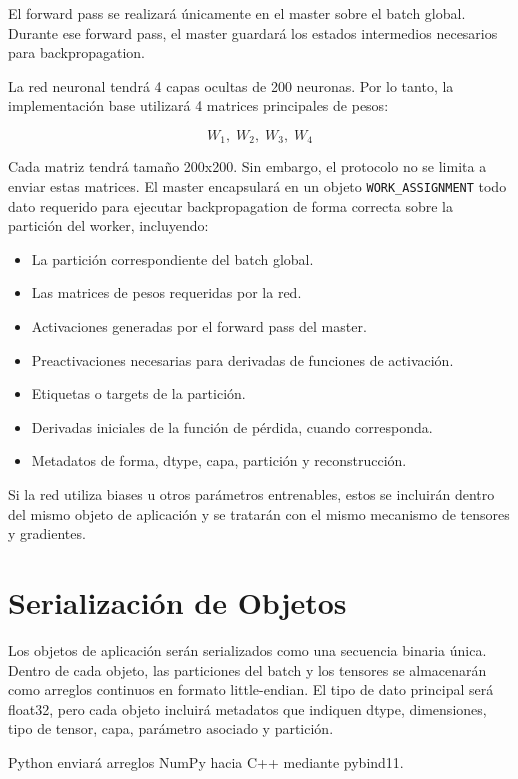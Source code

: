 \documentclass[12pt]{article}
\begin{document}
El forward pass se realizará únicamente en el master sobre el batch global. Durante ese forward pass, el master guardará los estados intermedios necesarios para backpropagation.

La red neuronal tendrá 4 capas ocultas de 200 neuronas. Por lo tanto, la implementación base utilizará 4 matrices principales de pesos:

\[
W_1,\; W_2,\; W_3,\; W_4
\]

Cada matriz tendrá tamaño 200x200. Sin embargo, el protocolo no se limita a enviar estas matrices. El master encapsulará en un objeto \texttt{WORK\_ASSIGNMENT} todo dato requerido para ejecutar backpropagation de forma correcta sobre la partición del worker, incluyendo:

\begin{itemize}
\item La partición correspondiente del batch global.
\item Las matrices de pesos requeridas por la red.
\item Activaciones generadas por el forward pass del master.
\item Preactivaciones necesarias para derivadas de funciones de activación.
\item Etiquetas o targets de la partición.
\item Derivadas iniciales de la función de pérdida, cuando corresponda.
\item Metadatos de forma, dtype, capa, partición y reconstrucción.
\end{itemize}

Si la red utiliza biases u otros parámetros entrenables, estos se incluirán dentro del mismo objeto de aplicación y se tratarán con el mismo mecanismo de tensores y gradientes.

\section{Serialización de Objetos}

Los objetos de aplicación serán serializados como una secuencia binaria única. Dentro de cada objeto, las particiones del batch y los tensores se almacenarán como arreglos continuos en formato little-endian. El tipo de dato principal será float32, pero cada objeto incluirá metadatos que indiquen dtype, dimensiones, tipo de tensor, capa, parámetro asociado y partición.

Python enviará arreglos NumPy hacia C++ mediante pybind11.
\end{document}
